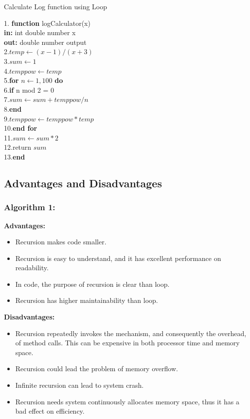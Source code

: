 \documentclass[a4paper, 11pt]{article}
\begin{document}
\begin{algorithm}
\caption{Calculate Log function using Loop}
\begin{algorithmic}
1. \textbf{function} logCalculator(x)\\
\textbf{in: } int double number x\\
\textbf{out: } double number output\\
2.\STATE $temp \leftarrow (x-1)/(x+3)$\\
3.\STATE $sum \leftarrow 1$\\
4.\STATE $temppow \leftarrow temp$\\
5.\textbf{for} {$n \leftarrow 1,100$} \textbf{do}\\
6.\qquad\STATE\textbf{if} \STATE n mod 2 \not= 0\\
7.\qquad\qquad\STATE $sum \leftarrow sum+temppow/n$\\
8.\qquad\STATE \textbf{end}\\
9.\qquad\STATE $temppow \leftarrow temppow*temp$\\
10.\textbf{end for} \\
11.\STATE $sum \leftarrow sum*2$\\
12.\STATE return $sum$\\
13.\STATE \textbf{end}\\
\end{algorithmic}
\end{algorithm}





\newpage
\subsection*{Advantages and Disadvantages}
\subsubsection*{Algorithm 1:}
\textbf{Advantages:}
\begin{itemize}
    \item Recursion makes code smaller.
    \item Recursion is easy to understand, and it has excellent performance on readability.
    \item In code, the purpose of recursion is clear than loop.
    \item Recursion has higher maintainability than loop.
\end{itemize}
\textbf{Disadvantages:}
\begin{itemize}
    \item Recursion repeatedly invokes the mechanism, and consequently the overhead, of method calls. This can be expensive in both processor time and memory space.
    \item Recursion could lead the problem of memory overflow.
    \item Infinite recursion can lead to system crash.
    \item Recursion needs system continuously allocates memory space, thus it has a bad effect on efficiency.
\end{itemize}
\end{document}
